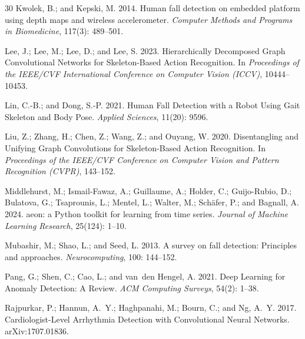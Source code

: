\begin{thebibliography}{30}
Kwolek, B.; and Kepski, M. 2014.
\newblock Human fall detection on embedded platform using depth maps and wireless accelerometer.
\newblock \emph{Computer Methods and Programs in Biomedicine}, 117(3): 489--501.

Lee, J.; Lee, M.; Lee, D.; and Lee, S. 2023.
\newblock Hierarchically Decomposed Graph Convolutional Networks for Skeleton-Based Action Recognition.
\newblock In \emph{Proceedings of the IEEE/CVF International Conference on Computer Vision (ICCV)}, 10444--10453.

Lin, C.-B.; and Dong, S.-P. 2021.
\newblock Human Fall Detection with a Robot Using Gait Skeleton and Body Pose.
\newblock \emph{Applied Sciences}, 11(20): 9596.

Liu, Z.; Zhang, H.; Chen, Z.; Wang, Z.; and Ouyang, W. 2020.
\newblock Disentangling and Unifying Graph Convolutions for Skeleton-Based Action Recognition.
\newblock In \emph{Proceedings of the IEEE/CVF Conference on Computer Vision and Pattern Recognition (CVPR)}, 143--152.

Middlehurst, M.; Ismail-Fawaz, A.; Guillaume, A.; Holder, C.; Guijo-Rubio, D.; Bulatova, G.; Tsaprounis, L.; Mentel, L.; Walter, M.; Sch{\"a}fer, P.; and Bagnall, A. 2024.
\newblock aeon: a Python toolkit for learning from time series.
\newblock \emph{Journal of Machine Learning Research}, 25(124): 1--10.

Mubashir, M.; Shao, L.; and Seed, L. 2013.
\newblock A survey on fall detection: Principles and approaches.
\newblock \emph{Neurocomputing}, 100: 144--152.

Pang, G.; Shen, C.; Cao, L.; and van~den Hengel, A. 2021.
\newblock Deep Learning for Anomaly Detection: A Review.
\newblock \emph{ACM Computing Surveys}, 54(2): 1--38.

Rajpurkar, P.; Hannun, A.~Y.; Haghpanahi, M.; Bourn, C.; and Ng, A.~Y. 2017.
\newblock Cardiologist-Level Arrhythmia Detection with Convolutional Neural Networks.
\newblock arXiv:1707.01836.


\end{thebibliography}
